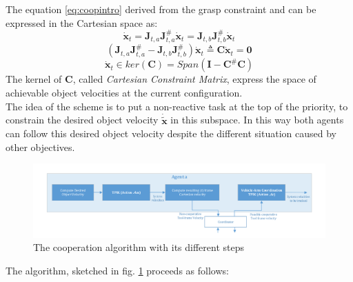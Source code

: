 The equation \eqref{eq:coopintro} derived from the grasp constraint and can be expressed in the Cartesian space as:
\begin{equation}
	\dot{\boldsymbol{x}}_t = \boldsymbol{J}_{t,a} \boldsymbol{J}^\#_{t,a} \dot{\boldsymbol{x}}_t =  \boldsymbol{J}_{t,b} \boldsymbol{J}^\#_{t,b} 
	\dot{\boldsymbol{x}}_t 
\end{equation}
\begin{equation}
\label{eq:constrainMatrixC}
	(\boldsymbol{J}_{t,a} \boldsymbol{J}^\#_{t,a} - \boldsymbol{J}_{t,b} \boldsymbol{J}^\#_{t,b}) 
	\dot{\boldsymbol{x}}_t \triangleq \boldsymbol{C} \dot{\boldsymbol{x}}_t = \boldsymbol{0}
\end{equation}
\begin{equation}
	\dot{\boldsymbol{x}}_t \in ker(\boldsymbol{C}) = Span(\boldsymbol{I} - \boldsymbol{C}^\#\boldsymbol{C})
\end{equation}
The kernel of $\boldsymbol{C}$, called \textit{Cartesian Constraint Matrix}, express the space of achievable object velocities at the current configuration.\\
The idea of the scheme is to put a non-reactive task at the top of the priority, to constrain the desired object velocity $\dot{\boldsymbol{\tilde{x}}}$ in this subspace. In this way both agents can follow this desired object velocity despite the different situation caused by other objectives.\\
\begin{figure}[H]
	\centering
	\centerline{
		\includegraphics[width=1.2\columnwidth]{coopScheme.png} }
	\caption{The cooperation algorithm with its different steps}
	\label{fig:coopScheme}
\end{figure}
The algorithm, sketched in fig. \ref{fig:coopScheme} proceeds as follows:
